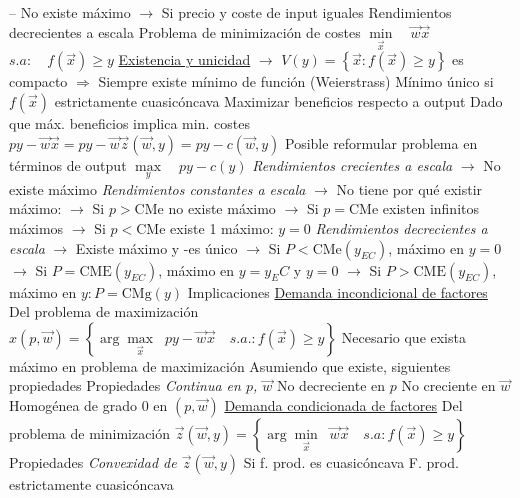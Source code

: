 \documentclass{nuevotema}
\begin{document}
\begin{esquemal}
				\4[] -- No existe máximo
				\4[] $\to$ Si precio y coste de input iguales
				\4[] 
				\4 Rendimientos decrecientes a escala
				\4[] 
			\3[Dual] Problema de minimización de costes
				\4[] $\underset{\vec{x}}{\min} \quad \vec{w} \vec{x}$
				\4[] $s.a: \quad f(\vec{x}) \geq y$
				\4 \underline{Existencia y unicidad}
				\4 $\to$ $V(y) = \left\lbrace \vec{x}: f(\vec{x}) \geq y \right\rbrace$ es compacto
				\4[] $\Rightarrow$ Siempre existe mínimo de función (Weierstrass)
				\4[] Mínimo único si $f(\vec{x})$ estrictamente cuasicóncava
				\4[] 
			\3 Maximizar beneficios respecto a output
				\4 Dado que máx. beneficios implica min. costes
				\4[] $py - \vec{w} \vec{x} = py - \vec{w} \vec{z} (\vec{w}, y) = py - c(\vec{w}, y)$
				\4[$\to$] Posible reformular problema en términos de output
				\4[] $\underset{y}{\max} \quad p y - c(y)$
				\4[] 
				\4[] \textit{Rendimientos crecientes a escala}
				\4[] $\to$ No existe máximo
				\4[] \textit{Rendimientos constantes a escala}
				\4[] $\to$ No tiene por qué existir máximo:
				\4[] $\to$ Si $p > \text{CMe}$ no existe máximo
				\4[] $\to$ Si $p = \text{CMe}$ existen infinitos máximos
				\4[] $\to$ Si $p < \text{CMe}$ existe 1 máximo: $y=0$
				\4[] \textit{Rendimientos decrecientes a escala}
				\4[] $\to$ Existe máximo y -es único
				\4[] $\to$ Si $P<\text{CMe}(y_{EC})$, máximo en $y=0$
				\4[] $\to$ Si $P=\text{CME}(y_{EC})$, máximo en $y=y_EC$ y $y=0$
				\4[] $\to$ Si $P>\text{CME}(y_{EC})$, máximo en $y: P=\text{CMg}(y)$
		\2 Implicaciones
			\3 \underline{Demanda incondicional de factores}
				\4 Del problema de maximización
				\4 $x(p, \vec{w}) = \left\lbrace \arg \underset{\vec{x}}{\max} \; \; py - \vec{w} \vec{x} \quad s.a.: f(\vec{x}) \geq y \right\rbrace$
				\4 Necesario que exista máximo en problema de maximización
				\4 Asumiendo que existe, siguientes propiedades
				\4 {Propiedades}
				\4[(i)] \textit{Continua en $p$, $\vec{w}$}
				\4[(ii)] No decreciente en $p$
				\4[(iii)] No creciente en $\vec{w}$
				\4[(iv)] Homogénea de grado 0 en $(p, \vec{w})$
			\3 \underline{Demanda condicionada de factores}
				\4 Del problema de minimización
				\4 $ \vec{z}(\vec{w}, y) = \left\lbrace \arg \underset{\vec{x}}{\min} \; \; \vec{w} \vec{x} \quad s.a: f(\vec{x}) \geq y \right\rbrace$
				\4 {Propiedades}
				\4[(i)] \textit{Convexidad de $\vec{z} (\vec{w}, y)$}
				\4[] Si f. prod. es cuasicóncava
				\4[(i')] F. prod. estrictamente cuasicóncava

\end{esquemal}
\end{document}
